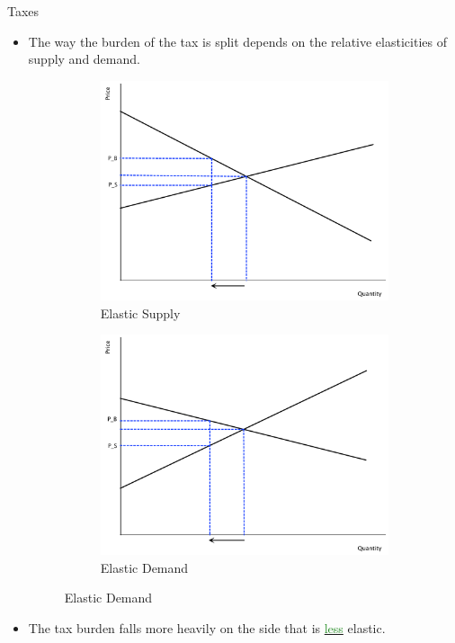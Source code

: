 \documentclass[xcolor={dvipsnames},pdf, hyperref={colorlinks=true, citecolor=ForestGreen, linkcolor=BlueViolet, urlcolor=Magenta}]{beamer}
\newcommand{\dd}[1]{{\underline{\textcolor{ForestGreen}{#1}}}}
\begin{document}
\begin{frame}{Taxes}
	\begin{itemize}
		\item The way the burden of the tax is split depends on the relative elasticities of supply and demand. 
		\begin{figure}[H]
			\centering
			\caption{Elasticity \& Tax Incidence}
			\begin{subfigure}{.3\textwidth}
			\includegraphics[scale=.2]{plot42.pdf}
				\caption{Elastic Supply}
			\end{subfigure}%
			\begin{subfigure}{.5\textwidth}
				\centering
			\includegraphics[scale=.2]{plot43.pdf}
				\caption{Elastic Demand}
			\end{subfigure}
		\end{figure}
	\item 	The tax burden falls more heavily on the side that is \dd{less} elastic.
	
	\end{itemize}
\end{frame}
\end{document}

